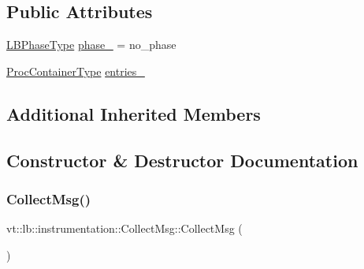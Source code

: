 \subsection*{Public Attributes}
\begin{DoxyCompactItemize}
\item 
\hyperlink{namespacevt_a5505d0bab25ce2ff566a8e015871b379}{L\+B\+Phase\+Type} \hyperlink{structvt_1_1lb_1_1instrumentation_1_1_collect_msg_abb032f5e30ac3cb1c9973b360ec75634}{phase\+\_\+} = no\+\_\+phase
\item 
\hyperlink{namespacevt_1_1lb_af7c6ee21a7b3966b7ab64c5b626d30f8}{Proc\+Container\+Type} \hyperlink{structvt_1_1lb_1_1instrumentation_1_1_collect_msg_a4431d40e13ec74c0efaef51d45e5feb0}{entries\+\_\+}
\end{DoxyCompactItemize}
\subsection*{Additional Inherited Members}


\subsection{Constructor \& Destructor Documentation}
\mbox{\label{structvt_1_1lb_1_1instrumentation_1_1_collect_msg_a00aba7d5ef8b2e803775b13ace386e60}} 
\subsubsection{\texorpdfstring{Collect\+Msg()}{CollectMsg()}\hspace{0.1cm}{\footnotesize\ttfamily [1/3]}}
{\footnotesize\ttfamily vt\+::lb\+::instrumentation\+::\+Collect\+Msg\+::\+Collect\+Msg (\begin{DoxyParamCaption}{ }\end{DoxyParamCaption})\hspace{0.3cm}{\ttfamily [default]}}

\mbox{\label{structvt_1_1lb_1_1instrumentation_1_1_collect_msg_a439937ef5646dc7d2b8be0dd68a9f2cf}} 
